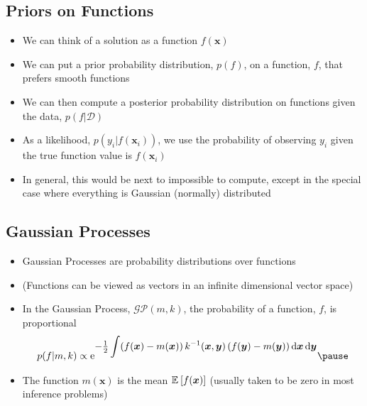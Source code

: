 \begin{slide}
\section{Priors on Functions}

\begin{PauseHighLight}
  \begin{itemize}
  \item We can think of a solution as a function $f(\bm{x})$\pause
  \item We can put a prior probability distribution, $p(f)$, on a
    function, $f$, that prefers smooth functions\pause
  \item We can then compute a posterior probability distribution on
    functions given the data, $p(f|\mathcal{D})$\pause
  \item As a likelihood, $p\left(y_i|f(\bm{x}_i)\right)$, we use the
    probability of observing $y_i$ given the true function value is
    $f(\bm{x}_i)$\pause
  \item In general, this would be next to impossible to compute\pause,
    except in the special case where everything is Gaussian (normally)
    distributed\pauseb
  \end{itemize}
\end{PauseHighLight}

\end{slide}


\begin{slide}
\section{Gaussian Processes}

\begin{PauseHighLight}
  \begin{itemize}
  \item Gaussian Processes are probability distributions over
    functions\pause
  \item (Functions can be viewed as vectors in an infinite dimensional
    vector space)\pause
  \item In the Gaussian Process, $\mathcal{GP}(m, k)$, the probability of
    a function, $f$, is proportional
    \begin{align*}
      p(f|m,k) \propto \E{-\tfrac{1}{2} \int (f(\bm{x})-m(\bm{x})) 
      \, k^{-1}(\bm{x},\bm{y}) \, (f(\bm{y}) -m(\bm{y})) \, \dd \bm{x}
      \, \dd \bm{y}}\pause
    \end{align*}
  \item The function $m(\bm{x})$ is the mean $\mathbb{E}_{}\left[ f(\bm{x}) \right]$ (usually
    taken to be zero in most inference problems)\pause
  \end{itemize}
\end{PauseHighLight}


\end{slide}

